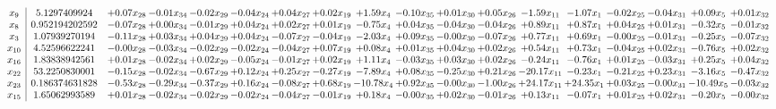 \documentclass[9pt]{article}
\begin{document}
 \[\begin{array}{c| c c@{\hskip 2pt} c@{\hskip 2pt} c@{\hskip 2pt} c@{\hskip 2pt} c@{\hskip 2pt} c@{\hskip 2pt} c@{\hskip 2pt} c@{\hskip 2pt} c@{\hskip 2pt} c@{\hskip 2pt} c@{\hskip 2pt} c@{\hskip 2pt} c@{\hskip 2pt} c@{\hskip 2pt} c@{\hskip 2pt} c@{\hskip 2pt} }
 x_{9}   &  5.1297409924 & +  0.07 x_{28} & -0.01 x_{34} & -0.02 x_{29} & -0.04 x_{24} & +  0.04 x_{27} & +  0.02 x_{19} & +  1.59 x_{4} & -0.10 x_{35} & +  0.01 x_{30} & +  0.05 x_{26} & -1.59 x_{11} & -1.07 x_{1} & -0.02 x_{25} & -0.04 x_{31} & +  0.09 x_{5} & +  0.01 x_{32}\\
 x_{8}   &  0.952194202592 & -0.07 x_{28} & +  0.00 x_{34} & -0.01 x_{29} & +  0.04 x_{24} & +  0.02 x_{27} & +  0.01 x_{19} & -0.75 x_{4} & +  0.04 x_{35} & -0.04 x_{30} & -0.04 x_{26} & +  0.89 x_{11} & +  0.87 x_{1} & +  0.04 x_{25} & +  0.01 x_{31} & -0.32 x_{5} & -0.01 x_{32}\\
 x_{3}   &  1.07939270194 & -0.11 x_{28} & +  0.03 x_{34} & +  0.04 x_{29} & +  0.04 x_{24} & -0.07 x_{27} & -0.04 x_{19} & -2.03 x_{4} & +  0.09 x_{35} & -0.00 x_{30} & -0.07 x_{26} & +  0.77 x_{11} & +  0.69 x_{1} & -0.00 x_{25} & -0.01 x_{31} & -0.25 x_{5} & -0.07 x_{32}\\
 x_{10}   &  4.52596622241 & -0.00 x_{28} & -0.03 x_{34} & -0.02 x_{29} & -0.02 x_{24} & -0.04 x_{27} & +  0.07 x_{19} & +  0.08 x_{4} & +  0.01 x_{35} & +  0.04 x_{30} & +  0.02 x_{26} & +  0.54 x_{11} & +  0.73 x_{1} & -0.04 x_{25} & +  0.02 x_{31} & -0.76 x_{5} & +  0.02 x_{32}\\
 x_{16}   &  1.83838942561 & +  0.01 x_{28} & -0.02 x_{34} & +  0.02 x_{29} & -0.05 x_{24} & -0.01 x_{27} & +  0.02 x_{19} & +  1.11 x_{4} & -0.03 x_{35} & +  0.03 x_{30} & +  0.02 x_{26} & -0.24 x_{11} & -0.76 x_{1} & +  0.01 x_{25} & -0.03 x_{31} & +  0.25 x_{5} & +  0.04 x_{32}\\
 x_{22}   &  53.2250830001 & -0.15 x_{28} & -0.02 x_{34} & -0.67 x_{29} & +  0.12 x_{24} & +  0.25 x_{27} & -0.27 x_{19} & -7.89 x_{4} & +  0.08 x_{35} & -0.25 x_{30} & +  0.21 x_{26} & -20.17 x_{11} & -0.23 x_{1} & -0.21 x_{25} & +  0.23 x_{31} & -3.16 x_{5} & -0.47 x_{32}\\
 x_{23}   &  0.186374631828 & -0.53 x_{28} & -0.29 x_{34} & -0.37 x_{29} & +  0.16 x_{24} & -0.08 x_{27} & +  0.68 x_{19} & -10.78 x_{4} & +  0.92 x_{35} & -0.00 x_{30} & -1.00 x_{26} & + 24.17 x_{11} & + 24.35 x_{1} & +  0.03 x_{25} & -0.00 x_{31} & -10.49 x_{5} & -0.03 x_{32}\\
 x_{15}   &  1.65062993589 & +  0.01 x_{28} & -0.02 x_{34} & -0.02 x_{29} & -0.02 x_{24} & -0.04 x_{27} & -0.01 x_{19} & +  0.18 x_{4} & -0.00 x_{35} & +  0.02 x_{30} & -0.01 x_{26} & +  0.13 x_{11} & -0.07 x_{1} & +  0.01 x_{25} & +  0.02 x_{31} & -0.20 x_{5} & -0.00 x_{32}\\

\end{array}\]
\end{document}
